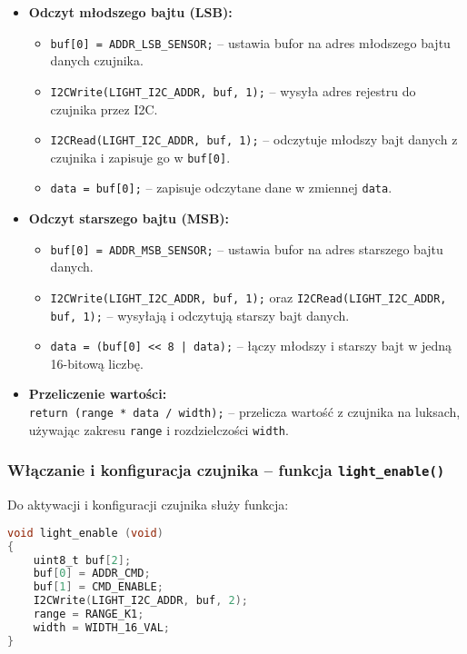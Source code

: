 \documentclass[a4paper,12pt]{report}
\begin{document}
\begin{itemize}
    \item \textbf{Odczyt młodszego bajtu (LSB):}
    \begin{itemize}
        \item \texttt{buf[0] = ADDR\_LSB\_SENSOR;} – ustawia bufor na adres młodszego bajtu danych czujnika.
        \item \texttt{I2CWrite(LIGHT\_I2C\_ADDR, buf, 1);} – wysyła adres rejestru do czujnika przez I2C.
        \item \texttt{I2CRead(LIGHT\_I2C\_ADDR, buf, 1);} – odczytuje młodszy bajt danych z czujnika i zapisuje go w \texttt{buf[0]}.
        \item \texttt{data = buf[0];} – zapisuje odczytane dane w zmiennej \texttt{data}.
    \end{itemize}

    \item \textbf{Odczyt starszego bajtu (MSB):}
    \begin{itemize}
        \item \texttt{buf[0] = ADDR\_MSB\_SENSOR;} – ustawia bufor na adres starszego bajtu danych.
        \item \texttt{I2CWrite(LIGHT\_I2C\_ADDR, buf, 1);} oraz \texttt{I2CRead(LIGHT\_I2C\_ADDR, buf, 1);} – wysyłają i odczytują starszy bajt danych.
        \item \texttt{data = (buf[0] << 8 | data);} – łączy młodszy i starszy bajt w jedną 16-bitową liczbę.
    \end{itemize}

    \item \textbf{Przeliczenie wartości:} \\
    \texttt{return (range * data / width);} – przelicza wartość z czujnika na luksach, używając zakresu \texttt{range} i rozdzielczości \texttt{width}.
\end{itemize}


\subsubsection*{Włączanie i konfiguracja czujnika – funkcja \texttt{light\_enable()}}

Do aktywacji i konfiguracji czujnika służy funkcja:

\begin{lstlisting}[language=C]
void light_enable (void)
{
    uint8_t buf[2];
    buf[0] = ADDR_CMD;
    buf[1] = CMD_ENABLE;
    I2CWrite(LIGHT_I2C_ADDR, buf, 2);
    range = RANGE_K1;
    width = WIDTH_16_VAL;
}
\end{lstlisting}
\end{document}
